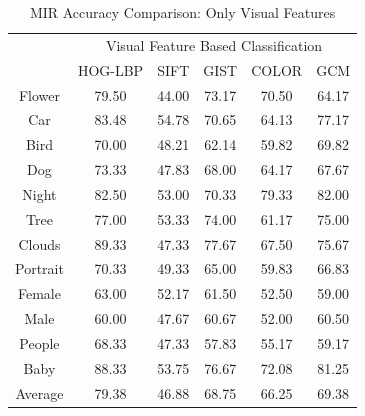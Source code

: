 \newpage


\begin{table}
\centering
\caption{ MIR Accuracy Comparison: Only Visual Features} %
\vspace*{0.2 cm}
\begin{tabular}{| c | c | c | c | c | c |}
\hline
 {\multirow{2}{*}{Labels}} & \multicolumn{5}{|c|}{Visual Feature Based Classification} \\
 \cline{2-6}
 & HOG-LBP & SIFT & GIST & COLOR & GCM \\ [1ex] \hline
Flower & 79.50 & 44.00 & 73.17 & 70.50 & 64.17 \\  [1ex] \hline
Car & 83.48 & 54.78 & 70.65 & 64.13 & 77.17 \\  [1ex] \hline
Bird & 70.00 & 48.21 & 62.14 & 59.82 & 69.82 \\  [1ex] \hline
Dog & 73.33 & 47.83 & 68.00 & 64.17 & 67.67 \\  [1ex] \hline
Night & 82.50 & 53.00 & 70.33 & 79.33 & 82.00 \\  [1ex] \hline
Tree & 77.00 & 53.33 & 74.00 & 61.17 & 75.00 \\  [1ex] \hline
Clouds & 89.33 & 47.33 & 77.67 & 67.50 & 75.67 \\  [1ex] \hline
Portrait & 70.33 & 49.33 & 65.00 & 59.83 & 66.83 \\  [1ex] \hline
Female & 63.00 & 52.17 & 61.50 & 52.50 & 59.00 \\  [1ex] \hline
Male & 60.00 & 47.67 & 60.67 & 52.00 & 60.50 \\  [1ex] \hline
People & 68.33 & 47.33 & 57.83 & 55.17 & 59.17 \\  [1ex] \hline
Baby & 88.33 & 53.75 & 76.67 & 72.08 & 81.25 \\  [1ex] \hline
Average & 79.38 & 46.88 & 68.75 & 66.25 & 69.38 \\  [1ex] \hline
\end{tabular}
\label{MIRAccuracyVisual} %
\end{table}

